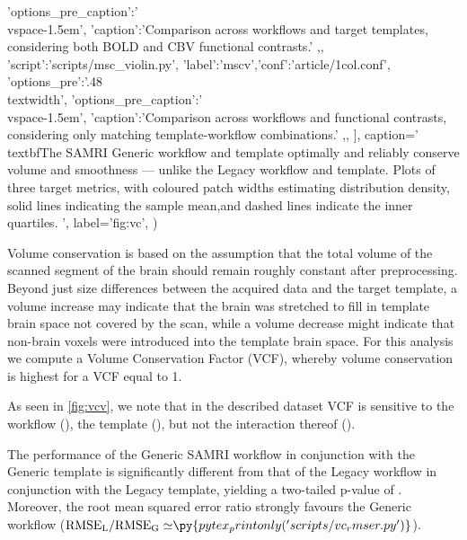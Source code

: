 \begin{sansmath}
{{                        'options_pre_caption':'\\vspace{-1.5em}',
			'caption':'Comparison across workflows and target templates, considering both BOLD and CBV functional contrasts.'
                        ,},
                {'script':'scripts/msc_violin.py', 'label':'mscv','conf':'article/1col.conf', 'options_pre':'{.48\\textwidth}',
                        'options_pre_caption':'\\vspace{-1.5em}',
                        'caption':'Comparison across workflows and functional contrasts, considering only matching template-workflow combinations.'
                        ,},
                ],
        caption='\\textbf{The SAMRI Generic workflow and template optimally and reliably conserve volume and smoothness --- unlike the Legacy workflow and template.}
        Plots of three target metrics, with coloured patch widths estimating distribution density, solid lines indicating the sample mean,and dashed lines indicate the inner quartiles.
        ',
        label='fig:vc',
        )}
\end{sansmath}

Volume conservation is based on the assumption that the total volume of the scanned segment of the brain should remain roughly constant after preprocessing.
Beyond just size differences between the acquired data and the target template, a volume increase may indicate that the brain was stretched to fill in template brain space not covered by the scan, while a volume decrease might indicate that non-brain voxels were introduced into the template brain space.
For this analysis we compute a Volume Conservation Factor (VCF), whereby volume conservation is highest for a VCF equal to 1.

As seen in \cref{fig:vcv}, we note that in the described dataset VCF is sensitive to
the workflow (),
the template (),
but not the interaction thereof ().

The performance of the Generic SAMRI workflow in conjunction with the Generic template is significantly different from that of the Legacy workflow in conjunction with the Legacy template, yielding a two-tailed p-value of .
Moreover, the root mean squared error ratio strongly favours the Generic workflow
($\mathrm{RMSE_{L}/RMSE_{G}\simeq} \py{pytex_printonly('scripts/vc_rmser.py')}$).

